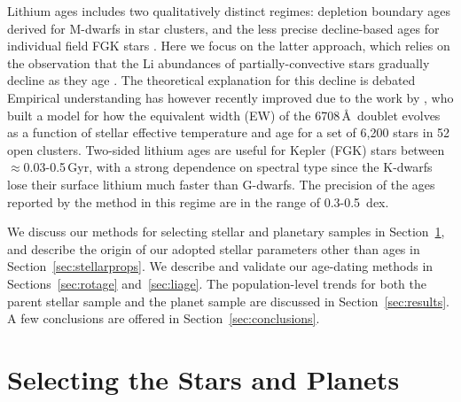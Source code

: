 \documentclass[11pt,twocolumn,tighten]{aastex63}
\begin{document}
Lithium ages includes two qualitatively distinct regimes: depletion
boundary ages derived for M-dwarfs in star clusters, and the less
precise decline-based ages for individual field FGK stars
\citep{Soderblom_2010}.  Here we focus on the latter approach, which
relies on the observation that the Li abundances of
partially-convective stars gradually decline as they age
\citep[e.g.][]{2005A&A...442..615S}.  The theoretical explanation for
this decline is debated
\citep[e.g.][]{1995ApJ...441..865C,2010ApJ...716.1269D,2019MNRAS.485.4052C}
Empirical understanding has however recently improved due to the work
by \citet{Jeffries_2023}, who built a model for how the equivalent
width (EW) of the  6708\,\AA\ doublet evolves as a function
of stellar effective temperature and age for a set of 6{,}200 stars in
52 open clusters.  Two-sided lithium ages are useful for Kepler (FGK)
stars between $\approx$0.03-0.5\,Gyr, with a strong dependence on
spectral type since the K-dwarfs lose their surface lithium much
faster than G-dwarfs.  The precision of the ages reported by the
\citet{Jeffries_2023} method in this regime are in the range of
0.3-0.5~dex.

We discuss our methods for selecting stellar and planetary samples in
Section~\ref{sec:selection}, and describe
the origin of our adopted stellar parameters other than ages in
Section~\ref{sec:stellarprops}.
We describe and validate our age-dating methods in
Sections~\ref{sec:rotage} and~\ref{sec:liage}.
The population-level trends for both the parent stellar sample and
the planet sample are discussed in Section~\ref{sec:results}.
A few conclusions are offered in Section~\ref{sec:conclusions}.


\section{Selecting the Stars and Planets}
\label{sec:selection}
\end{document}
